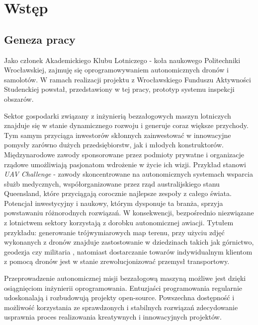 \chapter{Wstęp}


\section{Geneza pracy} \label{intro_genesis}

Jako członek Akademickiego Klubu Lotniczego - koła naukowego Politechniki Wrocławskiej,
zajmuję się oprogramowywaniem autonomicznych dronów i samolotów. W ramach realizacji
projektu z Wrocławskiego Funduszu Aktywności Studenckiej powstał, przedstawiony w
tej pracy, prototyp systemu inspekcji obszarów.

Sektor gospodarki związany z inżynierią bezzałogowych maszyn lotniczych znajduje się
w stanie dynamicznego rozwoju i generuje coraz większe przychody.
Tym samym przyciąga inwestorów skłonnych zainwestować w innowacyjne pomysły zarówno 
dużych przedsiębiorstw, jak i młodych konstruktorów. Międzynarodowe zawody sponsorowane
przez podmioty prywatne i organizacje rządowe umożliwiają pasjonatom wdrożenie w życie
ich wizji. Przykład stanowi \textit{UAV Challenge} - zawody skoncentrowane na
autonomicznych systemach wsparcia służb medycznych, współorganizowane przez rząd
australijskiego stanu Queensland, które przyciągają corocznie najlepsze zespoły z całego
świata\cite{uav_sponsors}. Potencjał inwestycyjny i naukowy, którym dysponuje ta branża,
sprzyja powstawaniu różnorodnych rozwiązań. W konsekwencji, bezpośrednio niezwiązane z
lotnictwem sektory korzystają z dorobku autonomicznej awiacji. Tytułem przykładu: 
generowanie trójwymiarowych map terenu, przy użyciu zdjęć wykonanych z dronów znajduje
zastostowanie w dziedzinach takich jak górnictwo, geodezja czy militaria
\cite{uav_photogrametry}, natomiast dostarczanie towarów indywidualnym klientom z pomocą
dronów jest w stanie zrewolucjonizować przemysł transportowy.

Przeprowadzenie autonomicznej misji bezzałogową maszyną możliwe jest dzięki osiągnięciom
inżynierii oprogramowania. Entuzjaści programowania regularnie udoskonalają i rozbudowują
projekty open-source. Powszechna dostępność i możliwość korzystania ze sprawdzonych
i stabilnych rozwiązań zdecydowanie usprawnia proces realizowania
kreatywnych i innowacyjnych projektów. 


